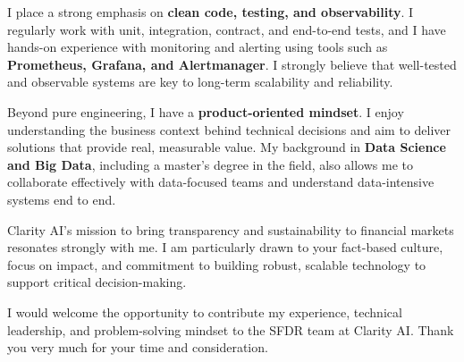 \documentclass[11pt,a4paper,sans]{moderncv}
\begin{document}
\begin{justify}
I place a strong emphasis on \textbf{clean code, testing, and observability}. I regularly work with unit, integration, contract, and end-to-end tests, and I have hands-on experience with monitoring and alerting using tools such as \textbf{Prometheus, Grafana, and Alertmanager}. I strongly believe that well-tested and observable systems are key to long-term scalability and reliability.

Beyond pure engineering, I have a \textbf{product-oriented mindset}. I enjoy understanding the business context behind technical decisions and aim to deliver solutions that provide real, measurable value. My background in \textbf{Data Science and Big Data}, including a master’s degree in the field, also allows me to collaborate effectively with data-focused teams and understand data-intensive systems end to end.

Clarity AI’s mission to bring transparency and sustainability to financial markets resonates strongly with me. I am particularly drawn to your fact-based culture, focus on impact, and commitment to building robust, scalable technology to support critical decision-making.

I would welcome the opportunity to contribute my experience, technical leadership, and problem-solving mindset to the SFDR team at Clarity AI. Thank you very much for your time and consideration.
\end{justify}

\makeletterclosing
\end{document}
